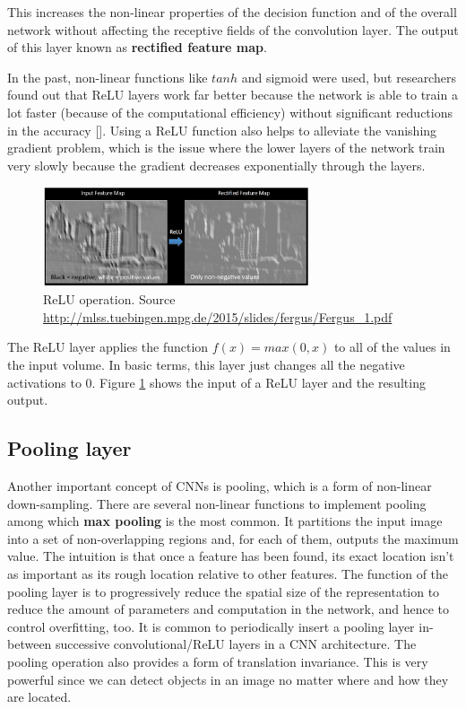 This increases the non-linear properties of the decision function and of the overall network without affecting the receptive fields of the convolution layer. The output of this layer known as \textbf{rectified feature map}.

In the past, non-linear functions like $tanh$ and sigmoid were used, but researchers found out that \ac{ReLU} layers work far better because the network is able to train a lot faster (because of the computational efficiency) without significant reductions in the accuracy [\cite{icml2010_NairH10}]. Using a \ac{ReLU} function also helps to alleviate the vanishing gradient problem, which is the issue where the lower layers of the network train very slowly because the gradient decreases exponentially through the layers.

\begin{figure}
	\centering
	\includegraphics[width=0.7\textwidth]{Images/relu}
	\caption{\ac{ReLU} operation. Source \url{http://mlss.tuebingen.mpg.de/2015/slides/fergus/Fergus_1.pdf}}\label{fig:relu}
\end{figure}

The ReLU layer applies the function $f(x) = max(0, x)$ to all of the values in the input volume. In basic terms, this layer just changes all the negative activations to 0. Figure \ref{fig:relu} shows the input of a \ac{ReLU} layer and the resulting output.

\subsection{Pooling layer}

Another important concept of \acsp{CNN} is pooling, which is a form of non-linear down-sampling. There are several non-linear functions to implement pooling among which \textbf{max pooling} is the most common. It partitions the input image into a set of non-overlapping regions and, for each of them, outputs the maximum value. The intuition is that once a feature has been found, its exact location isn't as important as its rough location relative to other features. The function of the pooling layer is to progressively reduce the spatial size of the representation to reduce the amount of parameters and computation in the network, and hence to control overfitting, too. It is common to periodically insert a pooling layer in-between successive convolutional/\acs{ReLU} layers in a \acs{CNN} architecture. The pooling operation also provides a form of translation invariance. This is very powerful since we can detect objects in an image no matter where and how they are located.

